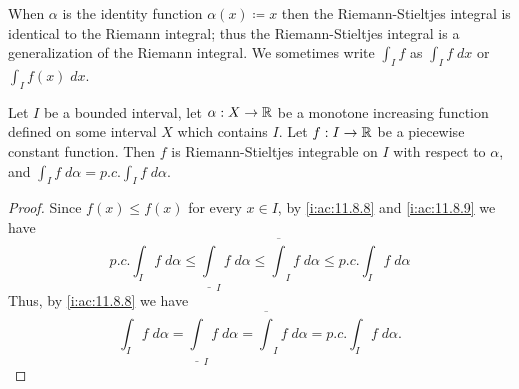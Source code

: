 \begin{note}
  When \(\alpha\) is the identity function \(\alpha(x) \coloneqq x\) then the Riemann-Stieltjes integral is identical to the Riemann integral;
  thus the Riemann-Stieltjes integral is a generalization of the Riemann integral.
  We sometimes write \(\int_I f\) as \(\int_I f \; dx\) or \(\int_I f(x) \; dx\).
\end{note}

\begin{ac}\label{i:ac:11.8.10}
  Let \(I\) be a bounded interval, let \(\alpha : X \to \mathbb{R}\) be a monotone increasing function defined on some interval \(X\) which contains \(I\).
  Let \(f : I \to \mathbb{R}\) be a piecewise constant function.
  Then \(f\) is Riemann-Stieltjes integrable on \(I\) with respect to \(\alpha\), and \(\int_I f \; d \alpha = p.c. \int_I f \; d \alpha\).
\end{ac}

\begin{proof}
  Since \(f(x) \leq f(x)\) for every \(x \in I\), by \cref{i:ac:11.8.8} and \cref{i:ac:11.8.9} we have
  \[
    p.c. \int_I f \; d \alpha \leq \underline{\int}_I f \; d \alpha \leq \overline{\int}_I f \; d \alpha \leq p.c. \int_I f \; d \alpha
  \]
  Thus, by \cref{i:ac:11.8.8} we have
  \[
    \int_I f \; d \alpha = \underline{\int}_I f \; d \alpha = \overline{\int}_I f \; d \alpha = p.c. \int_I f \; d \alpha.
  \]
\end{proof}

